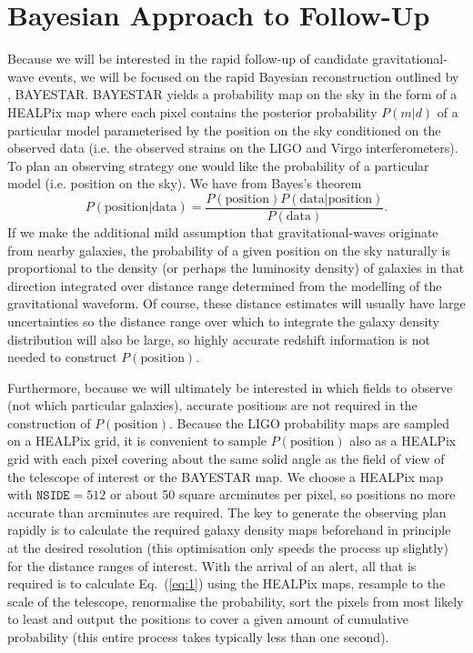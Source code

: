 \documentclass[useAMS,usenatbib]{mn2e}
\begin{document}
\section{Bayesian Approach to Follow-Up}

Because we will be interested in the rapid follow-up of candidate
gravitational-wave events, we will be focused on the rapid Bayesian
reconstruction outlined by \citet{2015arXiv150803634S}, BAYESTAR. 
BAYESTAR yields a probability map on the sky in
the form of a HEALPix map \citep{2005ApJ...622..759G} where each pixel
contains the posterior probability $P(m|d)$ of a particular model
parameterised by the position on the sky conditioned on the observed
data (i.e. the observed strains on the LIGO and Virgo
interferometers).  To plan an observing strategy one would like the
probability of a particular model (i.e. position on the sky).
We have from Bayes's theorem
\begin{equation}
  P(\mathrm{position}|\mathrm{data}) = \frac{P(\mathrm{position})
    P(\mathrm{data}|\mathrm{position})}{P(\mathrm{data})}.
  \label{eq:1}
\end{equation}
If we make the additional mild assumption that gravitational-waves
originate from nearby galaxies, the probability of a given position on
the sky naturally is proportional to the density (or perhaps the
luminosity density) of galaxies in that direction integrated over
distance range determined from the modelling of the gravitational
waveform.  Of course, these distance estimates will usually have large
uncertainties so the distance range over which to integrate the
galaxy density distribution will also be large, so highly accurate
redshift information is not needed to construct
$P(\mathrm{position})$.

Furthermore, because we will ultimately be interested in which fields
to observe (not which particular galaxies), accurate positions are not
required in the construction of $P(\mathrm{position})$. Because the
LIGO probability maps are sampled on a HEALPix grid, it is convenient
to sample $P(\mathrm{position})$ also as a HEALPix grid with each
pixel covering about the same solid angle as the field of view of the
telescope of interest or the BAYESTAR map.  We choose a HEALPix map
with $\mathtt{NSIDE}=512$ or about 50 square arcminutes per pixel, so
positions no more accurate than arcminutes are required.  The key to
generate the observing plan rapidly is to calculate the required
galaxy density maps beforehand in principle at the desired resolution
(this optimisation only speeds the process up slightly) for the
distance ranges of interest.  With the arrival of an alert, all that
is required is to calculate Eq.~(\ref{eq:1}) using the HEALPix maps,
resample to the scale of the telescope, renormalise the probability,
sort the pixels from most likely to least and output the positions to
cover a given amount of cumulative probability (this entire process
takes typically less than one second).
\end{document}
